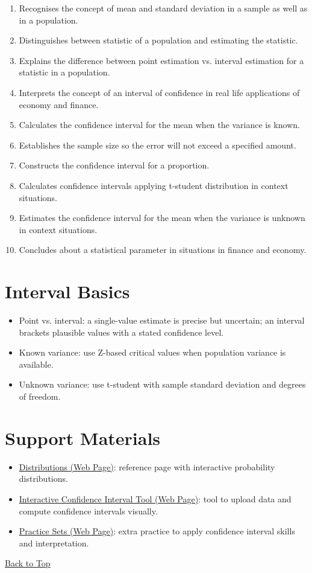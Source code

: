 \begin{enumerate}
	\item Recognises the concept of mean and standard deviation in a sample as well as in a population.
	\item Distinguishes between statistic of a population and estimating the statistic.
	\item Explains the difference between point estimation vs. interval estimation for a statistic in a population.
	\item Interprets the concept of an interval of confidence in real life applications of economy and finance.
	\item Calculates the confidence interval for the mean when the variance is known.
	\item Establishes the sample size so the error will not exceed a specified amount.
	\item Constructs the confidence interval for a proportion.
	\item Calculates confidence intervals applying t-student distribution in context situations.
	\item Estimates the confidence interval for the mean when the variance is unknown in context situations.
	\item Concludes about a statistical parameter in situations in finance and economy.
\end{enumerate}

\section{Interval Basics}\label{sec:interval-basics}

\begin{itemize}
	\item Point vs. interval: a single-value estimate is precise but uncertain; an interval brackets plausible values with a stated confidence level.
	\item Known variance: use Z-based critical values when population variance is available.
	\item Unknown variance: use t-student with sample standard deviation and degrees of freedom.
\end{itemize}

\section{Support Materials}\label{sec:interval-support-materials}

\begin{itemize}
	\item \href{pages/distributions.html}{Distributions (Web Page)}: reference page with interactive probability distributions.
	\item \href{pages/confidence_interval_tool.html}{Interactive Confidence Interval Tool (Web Page)}: tool to upload data and compute confidence intervals visually.
	\item \href{pages/practice_sets.html}{Practice Sets (Web Page)}: extra practice to apply confidence interval skills and interpretation.
\end{itemize}

\vspace{6pt}
\noindent\hyperref[table-of-contents]{Back to Top}
